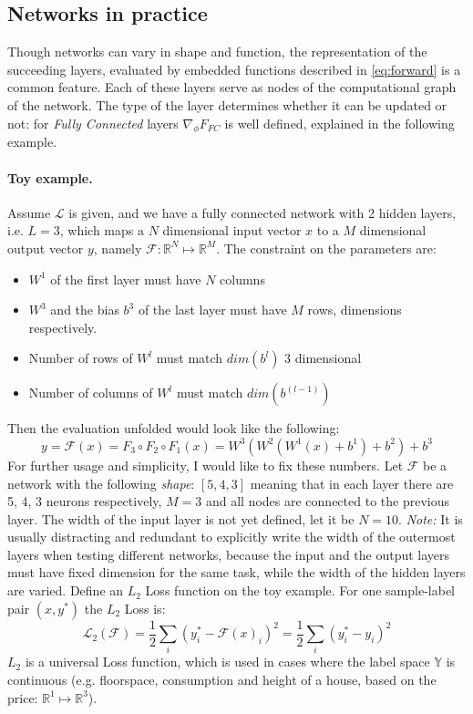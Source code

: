 \subsection{Networks in practice} 
Though networks can vary in shape and function, the representation of the succeeding layers, evaluated by embedded functions described in \ref{eq:forward} is a common feature. Each of these layers serve as nodes of the computational graph of the network. The type of the layer determines whether it can be updated or not: for \emph{Fully Connected} layers $\nabla_\phi F_{FC}$ is well defined, explained in the following example.

\paragraph{Toy example.} 
Assume $\mathcal{L}$ is given, and we have a fully connected network with 2 hidden layers, i.e. $L=3$, which maps a $N$ dimensional input vector $x$ to a $M$ dimensional output vector $y$, namely $\mathcal{F}:\mathbb{R}^N \mapsto \mathbb{R}^M$. The constraint on the parameters are:
\begin{itemize}
    \item[] $W^1$ of the first layer must have $N$ columns
    \item[] $W^3$ and the bias $b^3$ of the last layer must have $M$ rows, dimensions respectively.
    \item[] Number of rows of $W^l$ must match $dim(b^l)$ $3$ dimensional
    \item[] Number of columns of $W^l$ must match $dim(b^{(l-1)})$
\end{itemize} 
Then the evaluation unfolded would look like the following: 
$$y = \mathcal{F}(x) = F_3 \circ F_2 \circ F_1(x) = W^3(W^2(W^1(x)+b^1)+b^2)+b^3$$
For further usage and simplicity, I would like to fix these numbers.
Let $\mathcal{F}$ be a network with the following \emph{shape}: $\left[5, 4, 3\right] $
meaning that in each layer there are 5, 4, 3 neurons respectively, $M=3$ and all nodes are connected to the previous layer. The width of the input layer is not yet defined, let it be $N=10$. 
\emph{Note:} It is usually distracting and redundant to explicitly write the width of the outermost layers when testing different networks, because the input and the output layers must have fixed dimension for the same task, while the width of the hidden layers are varied.
Define an $L_2$ Loss function on the toy example. For one sample-label pair $(x,y^*)$ the $L_2$ Loss is:
\begin{equation}
    \mathcal{L}_2(\mathcal{F}) = \frac{1}{2} \sum_{i} (y_i^* - \mathcal{F}(x)_i)^2 = \frac{1}{2} \sum_{i} (y_i^* - y_i)^2
\end{equation}
$L_2$ is a universal Loss function, which is used in cases where the label space $\mathbb{Y}$ is continuous (e.g. floorspace, consumption and height of a house, based on the price: $\mathbb{R}^1 \mapsto \mathbb{R}^3$).

